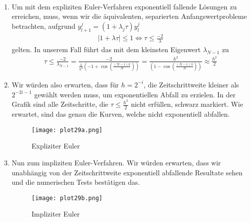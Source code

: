 \begin{solution}
\leavevmode \\
\begin{enumerate}[label = \textbf{\alph*)}]
\item Um mit dem expliziten Euler-Verfahren
exponentiell fallende Lösungen zu erreichen, muss, wenn wir
die äquivalenten, separierten Anfangswertprobleme betrachten,
aufgrund $y_{l + 1}^j = (1 + \lambda_j \tau)y_{l}^j$
\begin{align*}
  |1 + \lambda \tau| \leq 1 \iff \tau \leq \frac{-2}{\lambda}
\end{align*}
gelten. In unserem Fall führt das mit dem kleinsten Eigenwert $\lambda_{N - 1}$ zu
\begin{align*}
  \tau \leq \frac{-2}{\lambda_{N - 1}} =
  \frac{-2}{\frac{2}{h^2}\left(-1 + \cos\left(\frac{(N-1)\pi}{N}\right)\right)}
  =\frac{h^2}{\left(1 - \cos\left(\frac{(N-1)\pi}{N}\right)\right)}
  \approx \frac{h^2}{2}
\end{align*}
\item Wir würden also erwarten, dass für $h = 2^{-i}$, die Zeitschrittweite
kleiner als $2^{-2i-1}$ gewählt werden muss, um exponentiellen Abfall zu erzielen.
In der Grafik sind alle Zeitschritte, die $\tau \leq \frac{h^2}{2}$ nicht erfüllen,
schwarz markiert. Wie erwartet, sind das genau die Kurven, welche nicht exponentiell abfallen.
\FloatBarrier
\begin{figure}
    \centering
    \texttt{[image: plot29a.png]}
    \caption{Expliziter Euler}
\end{figure}
\FloatBarrier
\item Nun zum impliziten Euler-Verfahren. Wir würden erwarten, dass wir
unabhängig von der Zeitschrittweite exponentiell abfallende Resultate sehen
und die numerischen Tests bestätigen das.
\begin{figure}
    \centering
    \texttt{[image: plot29b.png]}
    \caption{Impliziter Euler}
\end{figure}
\FloatBarrier
\end{enumerate}
\end{solution}
